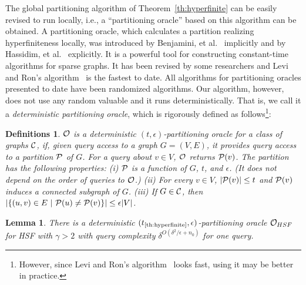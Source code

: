 \documentclass[11pt]{article}
\newtheorem{df}[thm]{Definitions}
\newtheorem{lm}[thm]{Lemma}
\begin{document}
The global partitioning algorithm of Theorem~\ref{th:hyperfinite} 
can be easily revised to run locally, 
i.e., a ``partitioning oracle'' based on this algorithm can be obtained. 
A partitioning oracle, which calculates a partition realizing hyperfiniteness locally, 
was introduced by Benjamini, et al.~\cite{BSS_MC-testable_STOC08} 
implicitly and by Hassidim, et al.~\cite{HKNO_LocalPartition_FOCS09} explicitly. 
It is a powerful tool for constructing constant-time algorithms 
for sparse graphs. It has been revised by some researchers and 
Levi and Ron's algorithm~\cite{Levi-Ron_PO_ICALP13} is the fastest to date. 
All algorithms for partitioning oracles presented to date have been randomized algorithms. 
Our algorithm, however, does not use any random valuable 
and it runs deterministically. 
That is, we call it a {\em deterministic partitioning oracle}, 
which is rigorously defined as follows\footnote{
However, since Levi and Ron's algorithm~\cite{Levi-Ron_PO_ICALP13} 
looks fast, using it may be better in practice. 
}: 

\begin{df}
${\cal O}$ is a deterministic $(t,\epsilon)$-partitioning oracle for 
a class of graphs ${\cal C}$, if, 
given query access to a graph $G = (V,E)$, 
it provides query access to a partition ${\cal P}$ of $G$. 
For a query about $v \in V$, 
${\cal O}$ returns 
${\cal P}(v)$. 
The partition has the following properties: 
(i) ${\cal P}$ is a function of $G$, $t$, and $\epsilon$. 
(It does not depend on the order of queries to ${\cal O}$.)
(ii) For every $v \in V$, 
$|{\cal P}(v)| \leq t$ and 
${\cal P}(v)$ induces a connected subgraph of $G$. 
(iii) If $G \in {\cal C}$, then 
$| \{ (u,v) \in E ~|~ {\cal P}(u) \neq {\cal P}(v) \}| \leq \epsilon |V|$. 
\end{df}





\begin{lm}\label{lm:PO}
There is a deterministic $(t_{\mbox{\scriptsize \ref{th:hyperfinite}}}, \epsilon)$-partitioning oracle ${\cal O}_{HSF}$ for HSF with $\gamma >2$ with query complexity $\delta^{O(\delta^2/\epsilon + n_0)}$ for one query. 
\end{lm}
\end{document}
